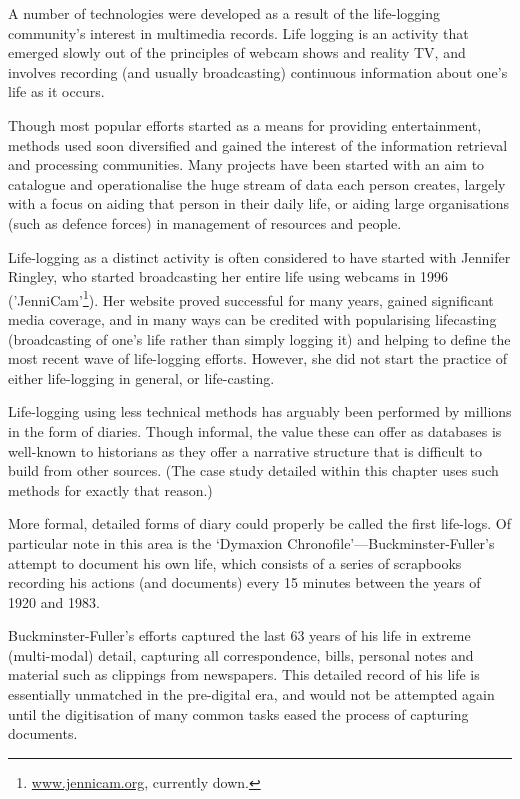 A number of technologies were developed as a result of the life-logging community's interest in multimedia records.  Life logging is an activity that emerged slowly out of the principles of webcam shows and reality TV, and involves recording (and usually broadcasting) continuous information about one's life as it occurs.

Though most popular efforts started as a means for providing entertainment, methods used soon diversified and gained the interest of the information retrieval and processing communities.  Many projects have been started with an aim to catalogue and operationalise the huge stream of data each person creates, largely with a focus on aiding that person in their daily life, or aiding large organisations (such as defence forces) in management of resources and people.





Life-logging as a distinct activity is often considered to have started with Jennifer Ringley, who started broadcasting her entire life using webcams in 1996 ('JenniCam'\footnote{\url{www.jennicam.org}, currently down.}).  Her website proved successful for many years, gained significant media coverage, and in many ways can be credited with popularising lifecasting (broadcasting of one's life rather than simply logging it) and helping to define the most recent wave of life-logging efforts.  However, she did not start the practice of either life-logging in general, or life-casting.


Life-logging using less technical methods has arguably been performed by millions in the form of diaries.  Though informal, the value these can offer as databases is well-known to historians as they offer a narrative structure that is difficult to build from other sources.  (The case study detailed within this chapter uses such methods for exactly that reason.)


More formal, detailed forms of diary could properly be called the first life-logs.  Of particular note in this area is the `Dymaxion Chronofile'---Buckminster-Fuller's attempt to document his own life, which consists of a series of scrapbooks recording his actions (and documents) every 15 minutes between the years of 1920 and 1983.

Buckminster-Fuller's efforts captured the last 63 years of his life in extreme (multi-modal) detail, capturing all correspondence, bills, personal notes and material such as clippings from newspapers.  This detailed record of his life is essentially unmatched in the pre-digital era, and would not be attempted again until the digitisation of many common tasks eased the process of capturing documents.


